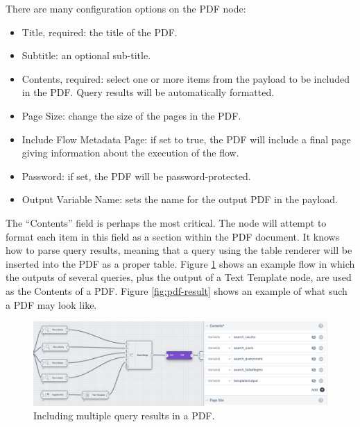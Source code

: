 There are many configuration options on the PDF node:

\begin{itemize}
\item Title, required: the title of the PDF.
\item Subtitle: an optional sub-title.
\item Contents, required: select one or more items from the payload to be included in the PDF. Query results will be automatically formatted.
\item Page Size: change the size of the pages in the PDF.
\item Include Flow Metadata Page: if set to true, the PDF will include a final page giving information about the execution of the flow.
\item Password: if set, the PDF will be password-protected.
\item Output Variable Name: sets the name for the output PDF in the payload.
\end{itemize}

The ``Contents'' field is perhaps the most critical. The node will attempt to format each item in this field as a section within the PDF document. It knows how to parse query results, meaning that a query using the table renderer will be inserted into the PDF as a proper table. Figure \ref{fig:pdf-contents} shows an example flow in which the outputs of several queries, plus the output of a Text Template node, are used as the Contents of a PDF. Figure \ref{fig:pdf-result} shows an example of what such a PDF may look like.

\begin{figure}
	\includegraphics[width=0.95\linewidth]{images/pdf-contents.png}
	\caption{Including multiple query results in a PDF.}
	\label{fig:pdf-contents}
\end{figure}

